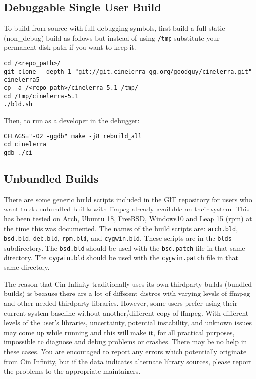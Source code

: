 \subsection{Debuggable Single User Build}%
\label{sub:debuggable_single_user_build}

To build from source with full debugging symbols, first build a full
static (non\_debug) build as follows but instead of using
\texttt{/tmp} substitute your permanent disk path if you want to
keep it.

\begin{lstlisting}[style=sh]
cd /<repo_path>/
git clone --depth 1 "git://git.cinelerra-gg.org/goodguy/cinelerra.git" cinelerra5 
cp -a /<repo_path>/cinelerra-5.1 /tmp/
cd /tmp/cinelerra-5.1
./bld.sh
\end{lstlisting}

Then, to run as a developer in the debugger:

\begin{lstlisting}[style=sh]
CFLAGS="-O2 -ggdb" make -j8 rebuild_all
cd cinelerra
gdb ./ci
\end{lstlisting}


\subsection{Unbundled Builds}%
\label{sub:unbundled_builds}

There are some generic build scripts included in the \CGG{} GIT
repository for users who want to do unbundled builds with ffmpeg
already available on their system.  This has been tested on Arch,
Ubuntu 18, FreeBSD, Windows10 and Leap 15 (rpm) at the time this
was documented.
%
The names of the build scripts are: \texttt{arch.bld},
\texttt{bsd.bld}, \texttt{deb.bld}, \texttt{rpm.bld}, and
\texttt{cygwin.bld}.  These scripts are in the \texttt{blds}
subdirectory.  The \texttt{bsd.bld} should be used with the
\texttt{bsd.patch} file in that same directory.  The
\texttt{cygwin.bld} should be used with the \texttt{cygwin.patch}
file in that same directory.

The reason that Cin Infinity traditionally uses its own thirdparty builds
(bundled builds) is because there are a lot of different distros
with varying levels of ffmpeg and other needed thirdparty
libraries.  However, some users prefer using their current system
baseline without another/different copy of ffmpeg.
%
With different levels of the user’s libraries, uncertainty,
potential instability, and unknown issues may come up while
running \CGG{} and this will make it, for all practical purposes,
impossible to diagnose and debug problems or crashes.
%
There may be no help in these cases.  You are encouraged to report
any errors which potentially originate from Cin Infinity, but if
the data indicates alternate library sources, please report the
problems to the appropriate maintainers.

